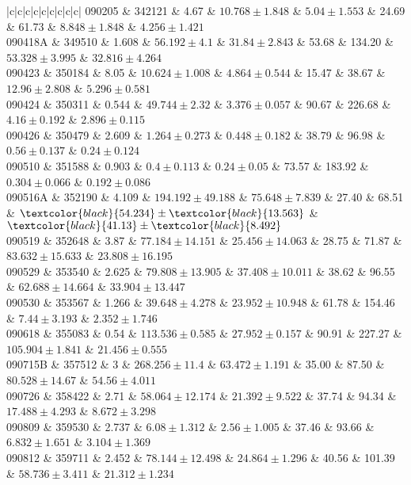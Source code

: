 \documentclass[prd,nofootinbib,preprintnumbers,floatfix]{revtex4}  %
\newcommand{\rthis}[1]{\textcolor{black}{#1}}
\begin{document}
\begin{center}
\begin{longtable*}{|c|c|c|c|c|c|c|c|c|}
090205	&	342121	&	4.67	&	$	10.768	\pm	1.848	$	&	$	5.04	\pm	1.553	$	&	24.69	&	61.73	&	$	8.848	\pm	1.848	$	&	$	4.256	\pm	1.421	$	\\
090418A	&	349510	&	1.608	&	$	56.192	\pm	4.1	$	&	$	31.84	\pm	2.843	$	&	53.68	&	134.20	&	$	53.328	\pm	3.995	$	&	$	32.816	\pm	4.264	$	\\
090423	&	350184	&	8.05	&	$	10.624	\pm	1.008	$	&	$	4.864	\pm	0.544	$	&	15.47	&	38.67	&	$	12.96	\pm	2.808	$	&	$	5.296	\pm	0.581	$	\\
090424	&	350311	&	0.544	&	$	49.744	\pm	2.32	$	&	$	3.376	\pm	0.057	$	&	90.67	&	226.68	&	$	4.16	\pm	0.192	$	&	$	2.896	\pm	0.115	$	\\
090426	&	350479	&	2.609	&	$	1.264	\pm	0.273	$	&	$	0.448	\pm	0.182	$	&	38.79	&	96.98	&	$	0.56	\pm	0.137	$	&	$	0.24	\pm	0.124	$	\\
090510	&	351588	&	0.903	&	$	0.4	\pm	0.113	$	&	$	0.24	\pm	0.05	$	&	73.57	&	183.92	&	$	0.304	\pm	0.066	$	&	$	0.192	\pm	0.086	$	\\
090516A	&	352190	&	4.109	&	$	194.192	\pm	49.188	$	&	$	75.648	\pm	7.839	$	&	27.40	&	68.51	&	$	\rthis{54.234}	\pm	\rthis{13.563}	$	&	$	\rthis{41.13}	\pm	\rthis{8.492}	$	\\
090519	&	352648	&	3.87	&	$	77.184	\pm	14.151	$	&	$	25.456	\pm	14.063	$	&	28.75	&	71.87	&	$	83.632	\pm	15.633	$	&	$	23.808	\pm	16.195	$	\\
090529	&	353540	&	2.625	&	$	79.808	\pm	13.905	$	&	$	37.408	\pm	10.011	$	&	38.62	&	96.55	&	$	62.688	\pm	14.664	$	&	$	33.904	\pm	13.447	$	\\
090530	&	353567	&	1.266	&	$	39.648	\pm	4.278	$	&	$	23.952	\pm	10.948	$	&	61.78	&	154.46	&	$	7.44	\pm	3.193	$	&	$	2.352	\pm	1.746	$	\\
090618	&	355083	&	0.54	&	$	113.536	\pm	0.585	$	&	$	27.952	\pm	0.157	$	&	90.91	&	227.27	&	$	105.904	\pm	1.841	$	&	$	21.456	\pm	0.555	$	\\
090715B	&	357512	&	3	&	$	268.256	\pm	11.4	$	&	$	63.472	\pm	1.191	$	&	35.00	&	87.50	&	$	80.528	\pm	14.67	$	&	$	54.56	\pm	4.011	$	\\
090726	&	358422	&	2.71	&	$	58.064	\pm	12.174	$	&	$	21.392	\pm	9.522	$	&	37.74	&	94.34	&	$	17.488	\pm	4.293	$	&	$	8.672	\pm	3.298	$	\\
090809	&	359530	&	2.737	&	$	6.08	\pm	1.312	$	&	$	2.56	\pm	1.005	$	&	37.46	&	93.66	&	$	6.832	\pm	1.651	$	&	$	3.104	\pm	1.369	$	\\
090812	&	359711	&	2.452	&	$	78.144	\pm	12.498	$	&	$	24.864	\pm	1.296	$	&	40.56	&	101.39	&	$	58.736	\pm	3.411	$	&	$	21.312	\pm	1.234	$	\\

\end{longtable*}
\end{center}
\end{document}
